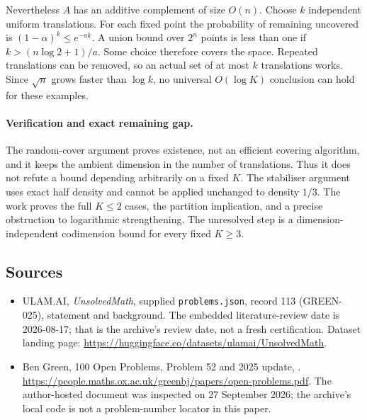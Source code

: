 \documentclass[11pt,a4paper]{article}
\begin{document}
Nevertheless $A$ has an additive complement of size $O(n)$. Choose $k$ independent uniform translations. For each fixed point the probability of remaining uncovered is $(1-\alpha)^k\leq e^{-ak}$. A union bound over $2^n$ points is less than one if $k>(n\log2+1)/a$. Some choice therefore covers the space. Repeated translations can be removed, so an actual set of at most $k$ translations works. Since $\sqrt n$ grows faster than $\log k$, no universal $O(\log K)$ conclusion can hold for these examples.

\paragraph{Verification and exact remaining gap.}
The random-cover argument proves existence, not an efficient covering algorithm, and it keeps the ambient dimension in the number of translations. Thus it does not refute a bound depending arbitrarily on a fixed $K$. The stabiliser argument uses exact half density and cannot be applied unchanged to density $1/3$. The work proves the full $K\leq2$ cases, the partition implication, and a precise obstruction to logarithmic strengthening. The unresolved step is a dimension-independent codimension bound for every fixed $K\geq3$.

\subsection{Sources}

{\small

\begin{itemize}

\item[\hypertarget{source:113:1}{S1}] ULAM.AI, \emph{UnsolvedMath}, supplied \texttt{problems.json}, record 113 (GREEN-025), statement and background. The embedded literature-review date is 2026-08-17; that is the archive’s review date, not a fresh certification. Dataset landing page: \url{https://huggingface.co/datasets/ulamai/UnsolvedMath}.

\item[\hypertarget{source:113:2}{S2}] Ben Green, 100 Open Problems, Problem 52 and 2025 update, . \url{https://people.maths.ox.ac.uk/greenbj/papers/open-problems.pdf}. The author-hosted document was inspected on 27 September 2026; the archive’s local code is not a problem-number locator in this paper.

\end{itemize}

}

\label{end:113}
\end{document}

